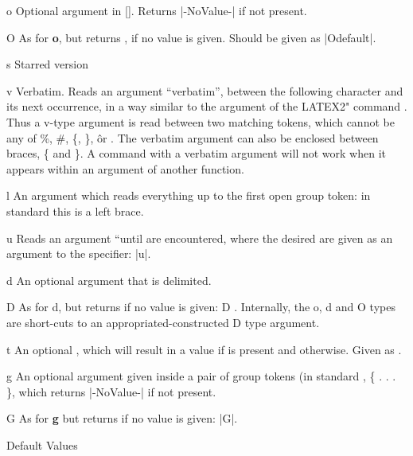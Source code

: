 \begin{marglist}
\item [o] Optional argument in  []. Returns |-NoValue-| if not present.
\item [O] As for \textbf{o}, but returns , if no value is given. Should be given as |O{default}|.

\item [s] Starred version
\item [v] Verbatim. Reads an argument “verbatim”, between the following character and its next occurrence,
in a way similar to the argument of the LATEX2" command \cmd{\verb}. Thus
a v-type argument is read between two matching tokens, which cannot be any of
\%, \#, \{, \}, \^ or  . The verbatim argument can also be enclosed between braces,
\{ and \}. A command with a verbatim argument will not work when it appears
within an argument of another function.
\item [l] An argument which reads everything up to the first open group token: in standard
\latex this is a left brace.
\item [u] Reads an argument “until  are encountered, where the desired 
are given as an argument to the specifier: |u|.
\item [d] An optional argument that is delimited. 
\item [D] As for d, but returns  if no value is given: D .
Internally, the o, d and O types are short-cuts to an appropriated-constructed D
type argument.
\item [t]  An optional , which will result in a value  if  is 
            present and  otherwise. Given as .
\item [g] An optional argument given inside a pair of \tex group tokens (in standard \latex,
              \{ . . . \}, which returns |-NoValue-| if not present.
\item [G] As  for \textbf{g} but returns  if no value is given: |G|.
\end{marglist}

\begin{texexample}{Default Values}{}
\DeclareDocumentCommand{}
\end{texexample}


